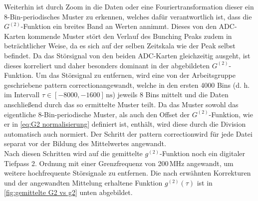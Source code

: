 Weiterhin ist durch Zoom in die Daten oder eine Fouriertransformation dieser ein 8-Bin-periodisches Muster zu erkennen, welches dafür verantwortlich ist, dass die $G^{(2)}$-Funktion ein breites Band an Werten annimmt. 
Dieses von den ADC-Karten kommende Muster stört den Verlauf des Bunching Peaks zudem in beträchtlicher Weise, da es sich auf der selben Zeitskala wie der Peak selbst befindet. 
Da das Störsignal von den beiden ADC-Karten gleichzeitig ausgeht, ist dieses korreliert und daher besonders dominant in der abgebildeten $G^{(2)}$-Funktion.
Um das Störsignal zu entfernen, wird eine von der Arbeitsgruppe geschriebene \glqq pattern correction\grqq\;angewandt, welche in den ersten 4000 Bins (d. h. im Intervall $\tau\in[-8000,-1600]\,\mathrm{ns}$) jeweils 8 Bins mittelt und die Daten anschließend durch das so ermittelte Muster teilt. 
Da das Muster sowohl das eigentliche 8-Bin-periodische Muster, als auch den Offset der $G^{(2)}$-Funktion, wie er in \autoref{eq:G2 normalisierung} definiert ist, enthält, wird diese durch die Division automatisch auch normiert. 
Der Schritt der \glqq pattern correction\grqq\;wird für jede Datei separat vor der Bildung des Mittelwertes angewandt. \\
Nach diesen Schritten wird auf die gemittelte $g^{(2)}$-Funktion noch ein digitaler Tiefpass 2. Ordnung mit einer Grenzfrequenz von 200\,MHz angewandt, um weitere hochfrequente Störsignale zu entfernen. 
Die nach erwähnten Korrekturen und der angewandten Mittelung erhaltene Funktion $g^{(2)}(\tau)$ ist in \autoref{fig:gemittelte G2 vs g2} unten abgebildet. 

